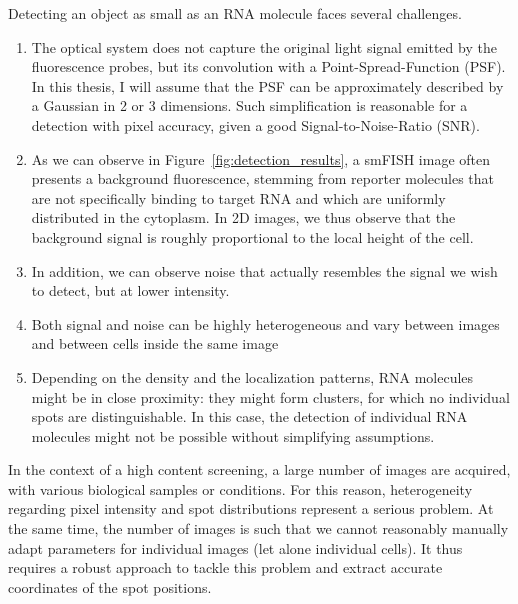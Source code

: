 Detecting an object as small as an \ac{RNA} molecule faces several challenges.
\begin{enumerate}
\item The optical system does not capture the original light signal emitted by the fluorescence probes, but its convolution with a Point-Spread-Function (\ac{PSF}).
In this thesis, I will assume that the \ac{PSF} can be approximately described by a Gaussian in 2 or 3 dimensions. 
Such simplification is reasonable for a detection with pixel accuracy, given a good Signal-to-Noise-Ratio (\ac{SNR}).
\item As we can observe in Figure~\ref{fig:detection_results}, a \ac{smFISH} image often presents a background fluorescence, stemming from reporter molecules that are not specifically binding to target RNA and which are uniformly distributed in the cytoplasm. In 2D images, we thus observe that the background signal is roughly proportional to the local height of the cell. 
\item In addition, we can observe noise that actually resembles the signal we wish to detect, but at lower intensity. 
\item Both signal and noise can be highly heterogeneous and vary between images and between cells inside the same image
\item Depending on the density and the localization patterns, RNA molecules might be in close proximity: they might form clusters, for which no individual spots are distinguishable. In this case, the detection of individual RNA molecules might not be possible without simplifying assumptions. 
\end{enumerate}


In the context of a high content screening, a large number of images are acquired, with various biological samples or conditions. For this reason, heterogeneity regarding pixel intensity and spot distributions represent a serious problem. At the same time, the number of images is such that we cannot reasonably manually adapt parameters for individual images (let alone individual cells). 
It thus requires a robust approach to tackle this problem and extract accurate coordinates of the spot positions.

